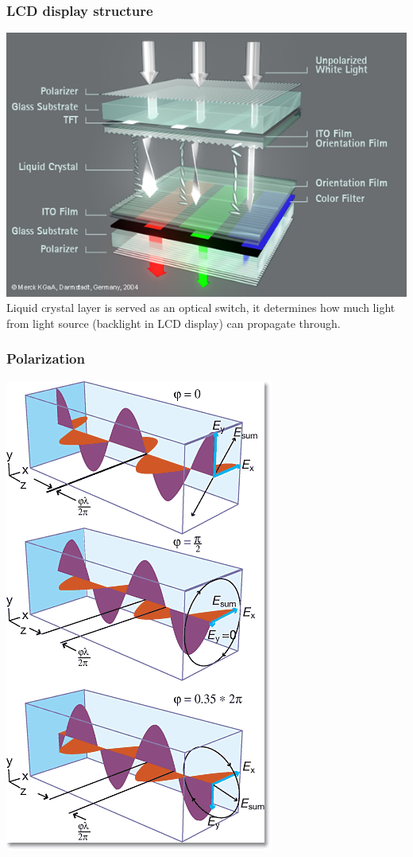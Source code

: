 \documentclass{beamer}
\begin{document}
\begin{frame}
\frametitle{LCD display structure}
\begin{center}
\includegraphics[scale=0.4]{LCD_Infografik_ENG_580_tcm1113_40163.jpg}
\\
Liquid crystal layer is served as an optical switch, it determines how much light from light source (backlight in LCD display) can propagate through.
\end{center}
\end{frame}
\begin{frame}
\frametitle{Polarization}
\begin{center}
\includegraphics[scale=0.4]{polarization.png}
\end{center}
\end{frame}
\end{document}
